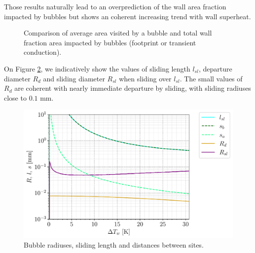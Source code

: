 \npar

Those results naturally lead to an overprediction of the wall area fraction impacted by bubbles but shows an coherent increasing trend with wall superheat.

\npar 



\begin{figure}[!h]
\caption{Comparison of average area visited by a bubble and total wall fraction area impacted by bubbles (footprint or transient conduction).}
\label{fig:fullkoss_area}
\end{figure}

\npar

On Figure \ref{fig:fullkoss_length}, we indicatively show the values of sliding length $l_{sl}$, departure diameter $R_{d}$ and sliding diameter $R_{sl}$ when sliding over $l_{sl}$. The small values of $R_{d}$ are coherent with nearly immediate departure by sliding, with sliding radiuses close to $0.1$ mm.


\begin{figure}[!h]
\centering
\includegraphics[width=0.65\linewidth]{img/HFP/fullcomp_Koss/length_G2000.pdf}
\caption{Bubble radiuses, sliding length and distances between sites.}
\label{fig:fullkoss_length}
\end{figure}

